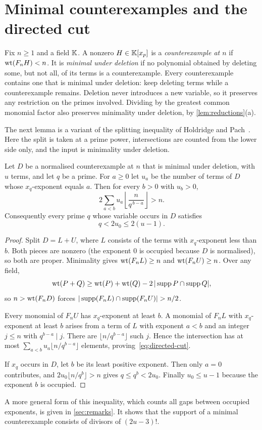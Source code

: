 \section{Minimal counterexamples and the directed cut}\label{sec:cut}

Fix $n\ge1$ and a field $\mathbb{K}$. A nonzero $H\in\mathbb{K}[x_p]$ is a \emph{counterexample at $n$} if $\operatorname{wt}(F_nH)<n$. It is \emph{minimal under deletion} if no polynomial obtained by deleting some, but not all, of its terms is a counterexample. Every counterexample contains one that is minimal under deletion: keep deleting terms while a counterexample remains. Deletion never introduces a new variable, so it preserves any restriction on the primes involved. Dividing by the greatest common monomial factor also preserves minimality under deletion, by \cref{lem:reductions}(a).

The next lemma is a variant of the splitting inequality of Holdridge and Pach~\cite[Lemma~4.1 and Corollary~4.3]{HP}. Here the split is taken at a prime power, intersections are counted from the lower side only, and the input is minimality under deletion.

\begin{lemma}\label{lem:directed-cut}
Let $D$ be a normalised counterexample at $n$ that is minimal under deletion, with $u$ terms, and let $q$ be a prime. For $a\ge0$ let $u_a$ be the number of terms of $D$ whose $x_q$-exponent equals $a$. Then for every $b>0$ with $u_b>0$,
\begin{equation}\label{eq:directed-cut}
 2\sum_{a<b}u_a\left\lfloor\frac{n}{q^{\,b-a}}\right\rfloor>n.
\end{equation}
Consequently every prime $q$ whose variable occurs in $D$ satisfies
\[
                    q<2u_0\le2(u-1).
\]
\end{lemma}

\begin{proof}
Split $D=L+U$, where $L$ consists of the terms with $x_q$-exponent less than $b$. Both pieces are nonzero (the exponent $0$ is occupied because $D$ is normalised), so both are proper. Minimality gives $\operatorname{wt}(F_nL)\ge n$ and $\operatorname{wt}(F_nU)\ge n$. Over any field,
\[
 \operatorname{wt}(P+Q)\ge\operatorname{wt}(P)+\operatorname{wt}(Q)-2\,|\operatorname{supp} P\cap\operatorname{supp} Q|,
\]
so $n>\operatorname{wt}(F_nD)$ forces $|\supp(F_nL)\cap\supp(F_nU)|>n/2$.

Every monomial of $F_nU$ has $x_q$-exponent at least $b$. A monomial of $F_nL$ with $x_q$-exponent at least $b$ arises from a term of $L$ with exponent $a<b$ and an integer $j\le n$ with $q^{b-a}\mid j$. There are $\lfloor n/q^{b-a}\rfloor$ such $j$. Hence the intersection has at most $\sum_{a<b}u_a\lfloor n/q^{b-a}\rfloor$ elements, proving~\eqref{eq:directed-cut}.

If $x_q$ occurs in $D$, let $b$ be its least positive exponent. Then only $a=0$ contributes, and $2u_0\lfloor n/q^b\rfloor>n$ gives $q\le q^b<2u_0$. Finally $u_0\le u-1$ because the exponent $b$ is occupied.
\end{proof}

A more general form of this inequality, which counts all gaps between occupied exponents, is given in \cref{sec:remarks}. It shows that the support of a minimal counterexample consists of divisors of $(2u-3)!$.
